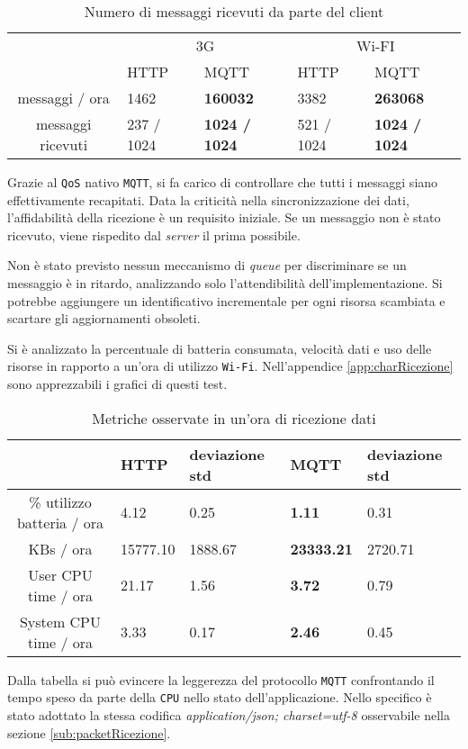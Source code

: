 \begin{table}[H]
  \begin{center}
  \begin{tabular}{| c | l | l | l | l |}
    \hline
     & \multicolumn{2}{|c|}{3G} & \multicolumn{2}{|c|}{Wi-FI} \\ \cline{2-5}
     & HTTP & MQTT & HTTP & MQTT \\ \hline
    messaggi / ora & 1462 & \textbf{160032} & 3382 & \textbf{263068} \\ \hline
    messaggi ricevuti & 237 / 1024 & \textbf{1024 / 1024} & 521 / 1024 & \textbf{1024 / 1024} \\ \hline
  \end{tabular}
  \label{tab:comparisonRicezione}
  \caption{Numero di messaggi ricevuti da parte del client}
  \end{center}
\end{table}

Grazie al \verb+QoS+ nativo \verb+MQTT+, si fa carico di controllare che tutti i messaggi siano effettivamente recapitati.
Data la criticità nella sincronizzazione dei dati, l'affidabilità della ricezione è un requisito iniziale.
Se un messaggio non è stato ricevuto, viene rispedito dal \textit{server} il prima possibile.

Non è stato previsto nessun meccanismo di \textit{queue} per discriminare se un messaggio è in ritardo, analizzando solo l'attendibilità dell'implementazione.
Si potrebbe aggiungere un identificativo incrementale per ogni risorsa scambiata e scartare gli aggiornamenti obsoleti.

Si è analizzato la percentuale di batteria consumata, velocità dati e uso delle risorse in rapporto a un'ora di utilizzo \verb+Wi-Fi+.
Nell'appendice \ref{app:charRicezione} sono apprezzabili i grafici di questi test.

\begin{table}[H]
  \begin{center}
  \begin{tabular}{| c | l | l | l | l |}
    \hline
     & HTTP & deviazione std & MQTT & deviazione std \\ \hline
    \% utilizzo batteria / ora & 4.12 & 0.25 & \textbf{1.11} & 0.31 \\ \hline
    KBs / ora & 15777.10 & 1888.67 & \textbf{23333.21} & 2720.71 \\ \hline
    User CPU time / ora & 21.17 & 1.56 & \textbf{3.72} & 0.79 \\ \hline
    System CPU time / ora & 3.33 & 0.17 & \textbf{2.46} & 0.45 \\ \hline
  \end{tabular}
  \label{tab:comparisonRicezione2}
  \caption{Metriche osservate in un'ora di ricezione dati}
  \end{center}
\end{table}

Dalla tabella si può evincere la leggerezza del protocollo \verb+MQTT+ confrontando il tempo speso da parte della \verb+CPU+ nello stato dell'applicazione.
Nello specifico è stato adottato la stessa codifica \textit{application/json; charset=utf-8} osservabile nella sezione \ref{sub:packetRicezione}.
